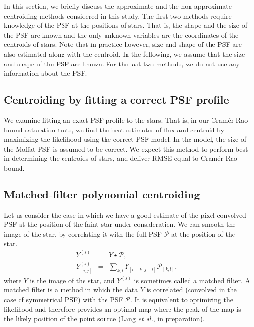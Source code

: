 \documentclass[onecolumn]{aastex61}
\newcommand{\todo}[1]{{\textcolor{dred}{ #1}}}
\begin{document}
\todo{In this section, we briefly discuss the approximate and the non-approximate centroiding methods considered in this 
study. The first two methods require knowledge of the PSF at the positions of stars. That is, the shape and the size of the PSF are known and the only unknown variables are the coordinates of the centroids of stars. 
Note that in practice however, size and shape of the PSF are also estimated along with the centroid. In the following, we assume that the size and shape of the PSF are known. For the last two methods, we do not use any information about the PSF.} 

\todo{\subsection{Centroiding by fitting a correct PSF profile}}

We examine fitting an exact PSF profile to the stars. That is, 
in our Cram\'{e}r-Rao bound saturation tests, we find the best
estimates of flux and centroid by maximizing the likelihood using 
the correct PSF model. \todo{In the model, the size of the Moffat PSF is 
assumed to be correct.} We expect this method to perform best in 
determining the centroids of stars, and deliver RMSE equal to 
Cram\'{e}r-Rao bound.


\todo{\subsection{Matched-filter polynomial centroiding}}

Let us consider the case in which we have a good estimate of the pixel-convolved PSF at
the position of the faint star under consideration. 
We can smooth the image of the star, by correlating it with the 
full PSF $\mathcal{P}$ at the position of the star.
\begin{eqnarray}
Y^{(s)} &=& Y \star \mathcal{P}, \\
Y^{(s)}_{[i,j]} &=& \sum_{k,l}Y_{[i-k,j-l]}\mathcal{P}_{[k,l]},
\end{eqnarray}
where $Y$ is the image of the star, and $Y^{(s)}$ is sometimes called a matched filter. 
A matched filter is a method in which the data $Y$ is correlated (convolved in the 
case of symmetrical PSF) with the PSF $\mathcal{P}$. It is equivalent to optimizing the 
likelihood and therefore provides an optimal map 
where the peak of the map is the likely position of the 
point source (Lang \emph{et al.}, in preparation).
\end{document}
